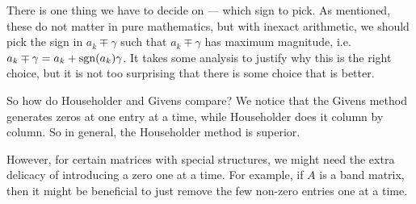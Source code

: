 \documentclass[a4paper]{article}
\begin{document}
There is one thing we have to decide on --- which sign to pick. As mentioned, these do not matter in pure mathematics, but with inexact arithmetic, we should pick the sign in $a_k \mp \gamma$ such that $a_k \mp \gamma$ has maximum magnitude, i.e.\ $a_k \mp \gamma = a_k + \operatorname{sgn}(a_k) \gamma$. It takes some analysis to justify why this is the right choice, but it is not too surprising that there is some choice that is better.

So how do Householder and Givens compare? We notice that the Givens method generates zeros at one entry at a time, while Householder does it column by column. So in general, the Householder method is superior.

However, for certain matrices with special structures, we might need the extra delicacy of introducing a zero one at a time. For example, if $A$ is a band matrix, then it might be beneficial to just remove the few non-zero entries one at a time.
\end{document}
